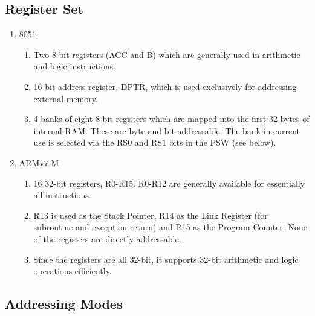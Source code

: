 \documentclass{article}
\begin{document}
\newpage
  \subsection{Register Set} \label{subsection:Registers} 

  \begin{enumerate}
    \item 8051:
    \begin{enumerate}
      \item Two 8-bit registers (ACC and B) which are generally used in arithmetic and logic instructions.
      \item 16-bit address register, DPTR, which is used
      exclusively for addressing external memory.
      \item 4 banks of eight 8-bit registers which are mapped into the first 32 bytes
      of internal RAM. These are byte and bit addressable. The bank in current use is selected
      via the RS0 and RS1 bits in the PSW (see below).
      \end{enumerate}
    \item ARMv7-M
    \begin{enumerate}
            \item 16 32-bit registers, R0-R15. R0-R12 are generally available for
            essentially all instructions.
            \item R13 is used as the Stack Pointer, R14 as the Link Register (for
            subroutine and exception return) and R15 as the Program Counter. None of the registers are directly addressable.
            \item Since the registers are all 32-bit, it supports 32-bit arithmetic and logic
            operations efficiently.
    \end{enumerate}
  \end{enumerate}

  \subsection{Addressing Modes} \label{subsection:Addressing Modes}
\end{document}
